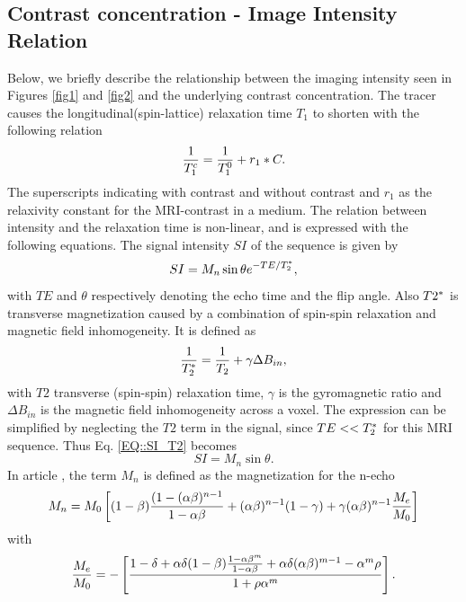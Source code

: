\documentclass[11pt,a4paper]{article}
\begin{document}
\subsection*{Contrast concentration - Image Intensity Relation}
Below, we briefly describe the relationship between the imaging intensity 
seen in Figures \ref{fig1} and \ref{fig2} and the underlying contrast 
concentration. 
The tracer causes the longitudinal(spin-lattice) relaxation time $T_{1}$ to shorten with the following relation
\begin{equation}
\frac{1}{T_{1}\sp{c}} = \frac{1}{T_{1}\sp{0}} + r_{1}*C .
\label{EQ::contrast}
\end{equation}
The superscripts indicating with contrast and without contrast and $r_1$ as the relaxivity constant for the MRI-contrast in a medium. The relation between intensity and the relaxation time is non-linear, and is expressed with the following equations. The signal intensity $SI$ of the sequence is given by
\begin{equation}
SI = M_{n} \sin \theta e\sp{ - TE/T_2\sp{*} },
\label{EQ::SI_T2}
\end{equation}
with  $TE$ and $\theta$ respectively denoting the echo time and the flip angle. Also $T2\sp{*}$ is transverse magnetization caused by a combination of spin-spin relaxation and magnetic field inhomogeneity. It is defined as 
\begin{equation}
\frac{1}{T_2\sp{*}} = \frac{1}{T_2} + \gamma \Delta B_{in} ,
\end{equation}
with $T2$ transverse (spin-spin) relaxation time, $\gamma$ is the gyromagnetic ratio and $\Delta B_{in}$ is the magnetic field inhomogeneity across a voxel. The expression can be simplified by neglecting the $T2$ term in the signal, since $TE <<T_2\sp{*}$ for this MRI sequence. Thus Eq. \ref{EQ::SI_T2} becomes 
\begin{equation}
SI = M_{n} \sin \theta.
\label{EQ::SI}
\end{equation}
In article  \cite{MPRAGE}, the term $M_n$ is defined as the magnetization for the n-echo 
\begin{equation}
M_{n} = M_{0}  \left[ (1-\beta)\frac{(1-(\alpha \beta)\sp{n-1} }{1-\alpha\beta} + (\alpha \beta)\sp{n-1}(1-\gamma) + \gamma ( \alpha \beta)\sp{n-1} \frac{M_{e}}{M_{0}}  \right]   
\end{equation}
with 
\begin{equation}
\frac{M_{e}}{M_{0}} = - \left[ \frac{ 1 -\delta + \alpha \delta (1-\beta ) \frac{1-\alpha\beta\sp{m}}{1-\alpha \beta} + \alpha\delta(\alpha\beta)\sp{m-1} - \alpha\sp{m}\rho}{1 +\rho \alpha\sp{m} } \right].
\end{equation}
\end{document}
